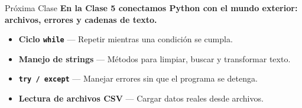 \documentclass[aspectratio=169, 11pt]{beamer}
\begin{document}
\begin{frame}{Próxima Clase}
  \vspace{-6pt}
  {\small\color{arcaDark}\bfseries
    En la Clase 5 conectamos Python con el mundo exterior:
    archivos, errores y cadenas de texto.}

  \vspace{8pt}
  {\footnotesize
  \begin{itemize}\setlength{\itemsep}{6pt}
    \item[{\color{arcaRed}\Large\faArrowCircleRight}]
      \textbf{Ciclo \texttt{while}} ---
      Repetir mientras una condición se cumpla.

    \item[{\color{arcaRed}\Large\faArrowCircleRight}]
      \textbf{Manejo de strings} ---
      Métodos para limpiar, buscar y transformar texto.

    \item[{\color{arcaRed}\Large\faArrowCircleRight}]
      \textbf{\texttt{try / except}} ---
      Manejar errores sin que el programa se detenga.

    \item[{\color{arcaRed}\Large\faArrowCircleRight}]
      \textbf{Lectura de archivos CSV} ---
      Cargar datos reales desde archivos.
  \end{itemize}
  }
\end{frame}

\begingroup
{}%
%

\begin{frame}
\end{frame}
\end{document}
